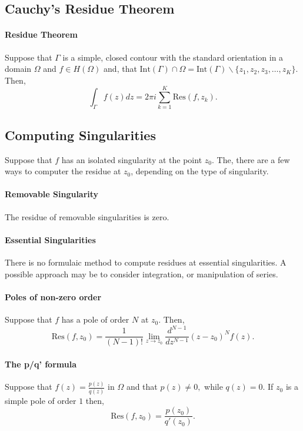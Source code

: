 \documentclass[12pt, letterpaper]{article}
\begin{document}
    
    \subsection{Cauchy's Residue Theorem}
    \paragraph{Residue Theorem}
    Suppose that \(\Gamma\) is a simple, closed contour with the standard
    orientation in a domain \(\Omega\) and \(f\in H(\Omega)\) and,
    that \(\mathrm{Int}(\Gamma) \cap \Omega
    = \mathrm{Int}(\Gamma) \backslash \{z_1, z_2, z_3, \dots, z_K \}.\)
    Then,
    \[ \int_\Gamma f(z)dz = 2\pi i \sum_{k=1}^{K} \mathrm{Res}(f, z_k).\]
    
    \subsection{Computing Singularities}
    Suppose that \(f\) has an isolated singularity at the point \(z_0\).
    The, there are a few ways to computer the residue at \(z_0\), depending
    on the type of singularity.

    \paragraph{Removable Singularity}
    The residue of removable singularities is zero.
    \paragraph{Essential Singularities}
    There is no formulaic method to compute residues at essential
    singularities. A possible approach may be to consider integration, or
    manipulation of series.
    \paragraph{Poles of non-zero order}
    Suppose that \(f\) has a pole of order \(N\) at \(z_0\). Then,
    \[ \mathrm{Res}(f, z_0) = \frac{1}{(N-1)!} 
    \lim_{z\to z_0} \frac{d^{N-1}}{dz^{N-1}} (z-z_0)^N f(z).\]

    \paragraph{The p/q' formula}
    Suppose that \(f(z) = \frac{p(z)}{q(z)}\) in \(\Omega\) and that 
    \(p(z) \neq 0,\) while \(q(z) = 0\). If \(z_0\) is a simple pole of
    order \(1\) then,
    \[ \mathrm{Res}(f, z_0) = \frac{p(z_0)}{q'(z_0)}.\]
    
    
\end{document}

